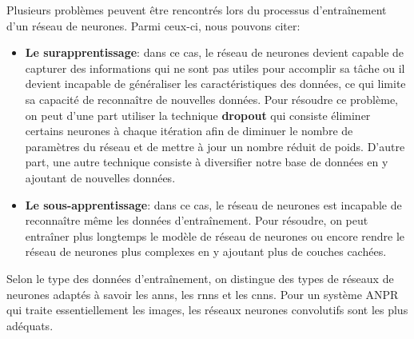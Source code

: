     Plusieurs problèmes peuvent être rencontrés lors du processus d'entraînement d'un réseau de neurones. Parmi ceux-ci, nous pouvons citer:
    \begin{itemize}
        \item \textbf{Le surapprentissage}: dans ce cas, le réseau de neurones devient capable de capturer des informations qui ne sont pas utiles pour accomplir sa tâche ou il devient incapable de généraliser les caractéristiques
        des données, ce qui limite sa capacité de reconnaître de nouvelles données. Pour résoudre ce problème, on peut d'une part utiliser la technique \textbf{dropout} qui consiste éliminer certains neurones à chaque itération afin de diminuer le nombre de paramètres du réseau et de mettre à
        jour un nombre réduit de poids. D'autre part, une autre technique consiste à diversifier notre base de données en y ajoutant de nouvelles données.\cite{dahmaneThesis}
        \item \textbf{Le sous-apprentissage}: dans ce cas, le réseau de neurones est incapable de reconnaître même les données d'entraînement. Pour résoudre, on peut entraîner plus longtemps le modèle de réseau de neurones ou encore rendre le réseau de neurones plus complexes en y ajoutant plus de couches cachées.
    \end{itemize}

    Selon le type des données d'entraînement, on distingue des types de réseaux de neurones adaptés à savoir les \acrshort{ann}s, les \acrshort{rnn}s et les \acrshort{cnn}s. Pour un système ANPR qui traite essentiellement les images, les réseaux neurones convolutifs sont les plus adéquats.

